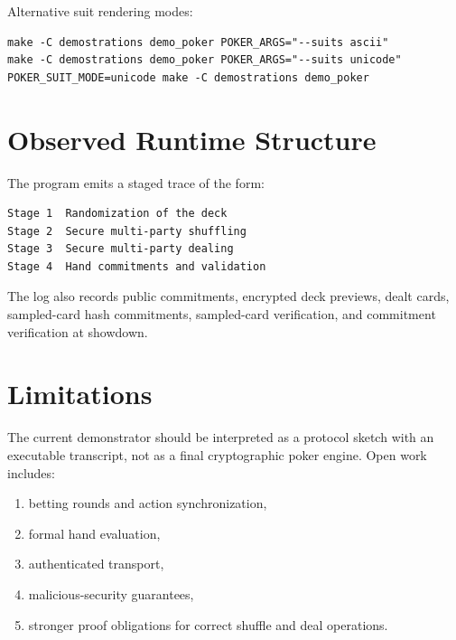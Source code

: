 Alternative suit rendering modes:
\begin{verbatim}
make -C demostrations demo_poker POKER_ARGS="--suits ascii"
make -C demostrations demo_poker POKER_ARGS="--suits unicode"
POKER_SUIT_MODE=unicode make -C demostrations demo_poker
\end{verbatim}

\section{Observed Runtime Structure}
The program emits a staged trace of the form:
\begin{verbatim}
Stage 1  Randomization of the deck
Stage 2  Secure multi-party shuffling
Stage 3  Secure multi-party dealing
Stage 4  Hand commitments and validation
\end{verbatim}
The log also records public commitments, encrypted deck previews, dealt cards,
sampled-card hash commitments, sampled-card verification, and commitment
verification at showdown.

\section{Limitations}
The current demonstrator should be interpreted as a protocol sketch with an
executable transcript, not as a final cryptographic poker engine. Open work
includes:
\begin{enumerate}
    \item betting rounds and action synchronization,
    \item formal hand evaluation,
    \item authenticated transport,
    \item malicious-security guarantees,
    \item stronger proof obligations for correct shuffle and deal operations.
\end{enumerate}
